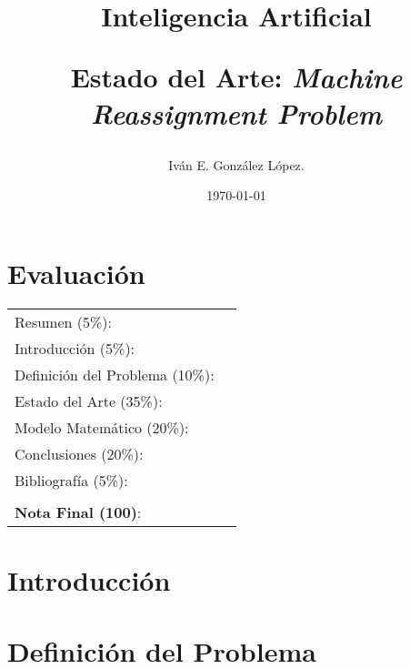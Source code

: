 \documentclass[letter, 10pt]{article}
\newcommand{\mrp}{\emph{Machine Reassignment Problem}}
\begin{document}
\title{Inteligencia Artificial \\ \begin{Large}Estado del Arte: \mrp\end{Large}}
\author{Iván E. González López.}
\date{\today}
\maketitle


\section*{Evaluación}
\begin{tabular}{ll}
Resumen (5\%): & \underline{\hspace{2cm}} \\
Introducción (5\%): & \underline{\hspace{2cm}} \\
Definición del Problema (10\%): & \underline{\hspace{2cm}} \\
Estado del Arte (35\%): & \underline{\hspace{2cm}} \\
Modelo Matemático (20\%): & \underline{\hspace{2cm}}\\
Conclusiones (20\%): & \underline{\hspace{2cm}}\\
Bibliografía (5\%): & \underline{\hspace{2cm}}\\
& \\
\textbf{Nota Final (100)}: & \underline{\hspace{2cm}}
\end{tabular}
\vspace{2cm}

\begin{abstract}

\end{abstract}
\section{Introducción}
\label{sec:introduccion}

\section{Definición del Problema}
\label{sec:definicion}

\end{document}

